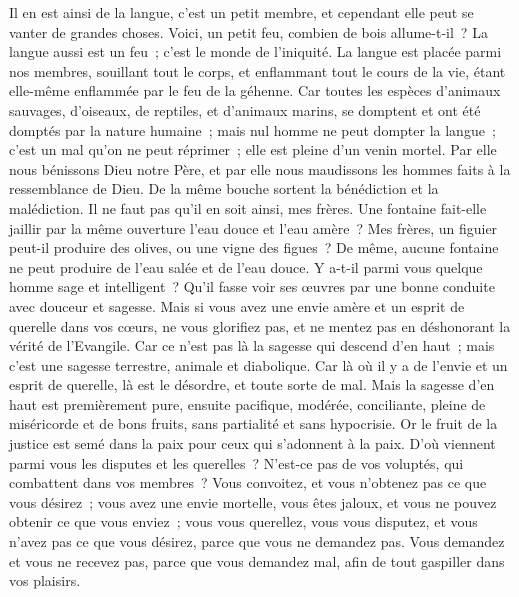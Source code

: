 \begin{multicols}{2}
Il en est ainsi de la langue, c'est un petit membre, et cependant elle peut se vanter de grandes choses. Voici, un petit feu, combien de bois allume-t-il~?
La langue aussi est un feu~; c'est le monde de l'iniquité. La langue est placée parmi nos membres, souillant tout le corps, et enflammant tout le cours de la vie, étant elle-même enflammée par le feu de la géhenne.
Car toutes les espèces d'animaux sauvages, d'oiseaux, de reptiles, et d'animaux marins, se domptent et ont été domptés par la nature humaine~;
mais nul homme ne peut dompter la langue~; c'est un mal qu'on ne peut réprimer~; elle est pleine d'un venin mortel.
Par elle nous bénissons Dieu notre Père, et par elle nous maudissons les hommes faits à la ressemblance de Dieu.
De la même bouche sortent la bénédiction et la malédiction. Il ne faut pas qu'il en soit ainsi, mes frères.
Une fontaine fait-elle jaillir par la même ouverture l'eau douce et l'eau amère~?
Mes frères, un figuier peut-il produire des olives, ou une vigne des figues~? De même, aucune fontaine ne peut produire de l'eau salée et de l'eau douce.
Y a-t-il parmi vous quelque homme sage et intelligent~? Qu'il fasse voir ses œuvres par une bonne conduite avec douceur et sagesse.
Mais si vous avez une envie amère et un esprit de querelle dans vos cœurs, ne vous glorifiez pas, et ne mentez pas en déshonorant la vérité de l'Evangile.
Car ce n'est pas là la sagesse qui descend d'en haut~; mais c'est une sagesse terrestre, animale et diabolique.
Car là où il y a de l'envie et un esprit de querelle, là est le désordre, et toute sorte de mal.
Mais la sagesse d'en haut est premièrement pure, ensuite pacifique, modérée, conciliante, pleine de miséricorde et de bons fruits, sans partialité et sans hypocrisie.
Or le fruit de la justice est semé dans la paix pour ceux qui s'adonnent à la paix.
\VerseOne{}D'où viennent parmi vous les disputes et les querelles~? N'est-ce pas de vos voluptés, qui combattent dans vos membres~?
Vous convoitez, et vous n'obtenez pas ce que vous désirez~; vous avez une envie mortelle, vous êtes jaloux, et vous ne pouvez obtenir ce que vous enviez~; vous vous querellez, vous vous disputez, et vous n'avez pas ce que vous désirez, parce que vous ne demandez pas.
Vous demandez et vous ne recevez pas, parce que vous demandez mal, afin de tout gaspiller dans vos plaisirs.

\end{multicols}

